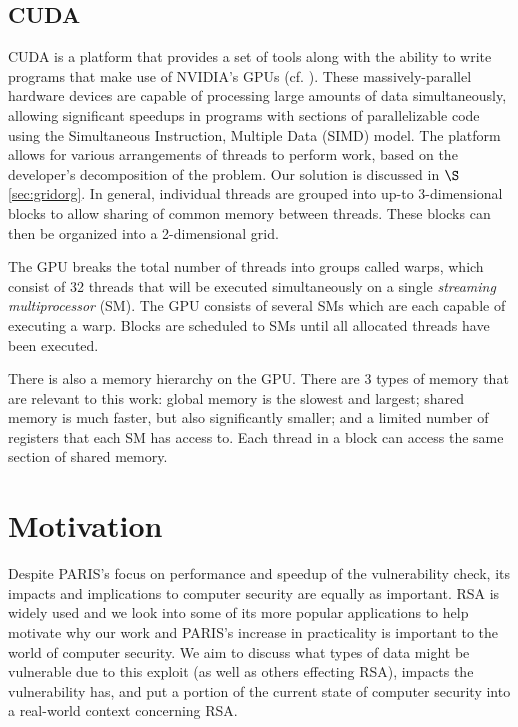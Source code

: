 \documentclass[12pt]{ucthesis}
\begin{document}
\section{CUDA}
\label{subsec:cuda}
CUDA is a platform that provides a set of tools along with the ability to 
write programs that make use of NVIDIA's GPUs (cf. 
\cite{nvidia2012programming}). These massively-parallel hardware devices are 
capable of processing large amounts of data simultaneously, allowing 
significant speedups in programs with sections of parallelizable code using 
the Simultaneous Instruction, Multiple Data (SIMD) model. The platform allows
for various arrangements of threads to perform work, based on the developer's
decomposition of the problem. Our solution is discussed in
$\S$\ref{sec:gridorg}. In general, individual threads are grouped into up-to
3-dimensional blocks to allow sharing of common memory between threads. These
blocks can then be organized into a 2-dimensional grid.  

The GPU breaks the total number of threads into groups called warps, which 
consist of 32 threads that will be executed simultaneously on a single
\textit{streaming multiprocessor} (SM). The GPU consists of several SMs which 
are each capable of executing a warp. Blocks are scheduled to SMs until all 
allocated threads have been executed. 

There is also a memory hierarchy on the GPU. There are 3 types of memory 
that are relevant to this work: global memory is the slowest and 
largest; shared memory is much faster, but also significantly smaller; and 
a limited number of registers that each SM has access to. Each thread in a
block can access the same section of shared memory.


\chapter{Motivation}
\label{sec:motivation}
Despite PARIS's focus on performance and speedup of the vulnerability check,
its impacts and implications to computer security are equally as important.
RSA is widely used and we look into some of its more popular applications to
help motivate why our work and PARIS's increase in practicality is important to
the world of computer security. We aim to discuss what types of data might be
vulnerable due to this exploit (as well as others effecting RSA), impacts the
vulnerability has, and put a portion of the current state of computer security
into a real-world context concerning RSA.
\end{document}
